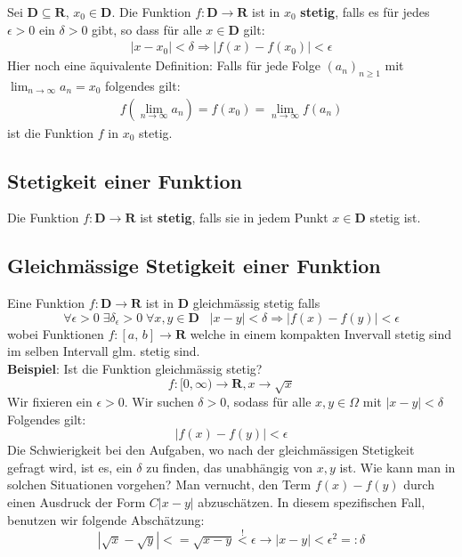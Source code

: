 \documentclass[8pt]{extarticle}
\begin{document}
\begin{multicols*}{3}
Sei $\mathbf{D} \subseteq \mathbf{R}$, $x_0 \in \mathbf{D}$. Die Funktion
$f: \mathbf{D} \rightarrow \mathbf{R}$ ist in $x_0$ \textbf{stetig}, falls
es für jedes $\epsilon > 0$ ein $\delta > 0$ gibt, so dass für alle $x \in \mathbf{D}$
gilt:
\begin{align*}
  |x - x_0| < \delta \Rightarrow |f(x) - f(x_0)| < \epsilon 
\end{align*}
Hier noch eine äquivalente Definition: Falls für jede Folge $(a_n)_{n \geq 1}$ mit
$\lim_{n \rightarrow \infty} a_n = x_0$ folgendes gilt:
\begin{align*}
  f(\lim_{n \rightarrow \infty} a_n) = f(x_0) = \lim_{n \rightarrow \infty} f(a_n)
\end{align*}
ist die Funktion $f$ in $x_0$ stetig.

\subsection{Stetigkeit einer Funktion}

Die Funktion $f: \mathbf{D} \rightarrow \mathbf{R}$ ist \textbf{stetig}, falls sie
in jedem Punkt $x \in \mathbf{D}$ stetig ist.

\subsection{Gleichmässige Stetigkeit einer Funktion}

Eine Funktion $f:\mathbf{D} \rightarrow \mathbf{R}$ ist in $\mathbf{D}$ gleichmässig
stetig falls $$ \forall \epsilon > 0 \; \exists \delta_{\epsilon} > 0 \;\forall x, y \in \mathbf{D}\;\;\; |x-y| < \delta \Rightarrow |f(x) - f(y)| < \epsilon $$
wobei Funktionen $f:[a,\,b] \rightarrow \mathbf{R}$ welche in einem kompakten Invervall stetig sind im selben Intervall glm. stetig sind.\\
\textbf{Beispiel}: Ist die Funktion gleichmässig stetig? 
$$
f: [0, \infty)  \rightarrow \mathbf{R}, x \rightarrow \sqrt{x}
$$
Wir fixieren ein $\epsilon > 0$. Wir suchen $\delta > 0$, sodass für alle $x, y \in \Omega$ mit $|x - y| < \delta$ Folgendes gilt:
$$
|f(x) - f(y)| < \epsilon
$$
Die Schwierigkeit bei den Aufgaben, wo nach der gleichmässigen Stetigkeit gefragt wird, ist es, ein $\delta$ zu finden, das unabhängig von $x, y$ ist. Wie kann man in solchen Situationen vorgehen? Man vernucht, den Term $f(x) - f(y)$ durch einen Ausdruck der Form $C|x - y|$ abzuschätzen. In diesem spezifischen Fall, benutzen wir folgende Abschätzung:
$$
|\sqrt{x} - \sqrt{y}| <= \sqrt{x - y} \overset{!}{<} \epsilon \rightarrow |x - y| < \epsilon^2 =: \delta
$$


\end{multicols*}
\end{document}
